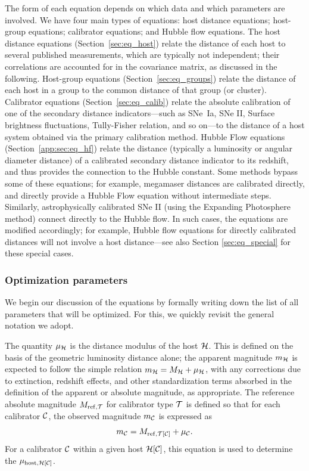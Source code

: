 The form of each equation depends on which data and which parameters are involved. We have four main types of equations: host distance equations; host-group equations; calibrator equations; and Hubble flow equations. The host distance equations (Section~\ref{sec:eq_host}) relate the distance of each host to several published measurements, which are typically not independent; their correlations are accounted for in the covariance matrix, as discussed in the following. Host-group equations (Section~\ref{sec:eq_groups}) relate the distance of each host in a group to the common distance of that group (or cluster).  Calibrator equations (Section~\ref{sec:eq_calib}) relate the absolute calibration of one of the secondary distance indicators---such as SNe~Ia, SNe II, Surface brightness fluctuations, Tully-Fisher relation, and so on---to the distance of a host system obtained via the primary calibration method. Hubble Flow equations (Section~\ref{app:sec:eq_hf}) relate the distance (typically a luminosity or angular diameter distance) of a calibrated secondary distance indicator to its redshift, and thus provides the connection to the Hubble constant. Some methods bypass some of these equations; for example, megamaser distances are calibrated directly, and directly provide a Hubble Flow equation without intermediate steps. Similarly, astrophysically calibrated SNe II (using the Expanding Photosphere method) connect directly to the Hubble flow. In such cases, the equations are modified accordingly; for example, Hubble flow equations for directly calibrated distances will not involve a host distance---see also Section \ref{sec:eq_special} for these special cases.


\subsubsection {Optimization parameters}\label{sec:optimization_parameters}
We begin our discussion of the equations by formally writing down the list of all parameters that will be optimized. For this, we quickly revisit the general notation we adopt.

The quantity $ \mu_{\ihost} $ is the distance modulus of the host $ \ihost $.  This is defined on the basis of the geometric luminosity distance alone; the apparent magnitude $ m_{\ihost} $ is expected to follow the simple relation $ m_{\ihost} = M_{\ihost} + \mu_{\ihost} $, with any corrections due to extinction, redshift effects, and other standardization terms absorbed in the definition of the apparent or absolute magnitude, as appropriate. The reference absolute magnitude $ M_{{\rm ref}, \itype} $ for calibrator type $ \itype $ is defined so that for each calibrator $ \icalib $, the observed magnitude $ m_{ \icalib} $ is expressed as 
\begin{equation}
     m_{\icalib} = M_{{\rm ref}, \itype[\icalib]} + \mu_{\icalib} .
\end{equation}
For a calibrator $\icalib$ within a given host $\ihost[\icalib]$, this equation is used to determine the $\mu_{\mathrm{host},\ihost[\icalib]}$.


